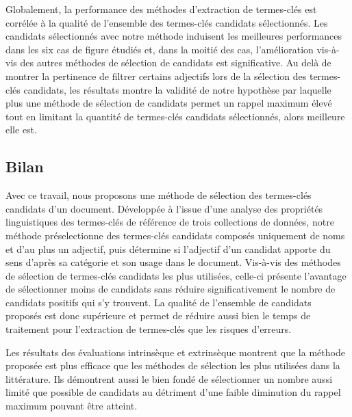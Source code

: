         Globalement, la performance des méthodes d'extraction de termes-clés est
        corrélée à la qualité de l'ensemble des termes-clés candidats
        sélectionnés. Les candidats sélectionnés avec notre méthode induisent
        les meilleures performances dans les six cas de figure étudiés et, dans
        la moitié des cas, l'amélioration vis-à-vis des autres méthodes de
        sélection de candidats est significative. Au delà de montrer la
        pertinence de filtrer certains adjectifs lors de la sélection des
        termes-clés candidats, les résultats montre la validité de notre
        hypothèse par laquelle plus une méthode de sélection de candidats permet
        un rappel maximum élevé tout en limitant la quantité de termes-clés
        candidats sélectionnés, alors meilleure elle est.

    \subsection{Bilan}
    \label{subsec:main-automatic_keyphrase_annotation-keyphrase_candidate_selection-conclusion}
      Avec ce travail, nous proposons une méthode de sélection des termes-clés
      candidats d'un document. Développée à l'issue d'une analyse des
      propriétés linguistiques des termes-clés de référence de trois collections
      de données, notre méthode préselectionne des termes-clés candidats
      composés uniquement de noms et d'au plus un adjectif, puis détermine si
      l'adjectif d'un candidat apporte du sens d'après sa catégorie et son usage
      dans le document. Vis-à-vis des méthodes de sélection de termes-clés
      candidats les plus utilisées, celle-ci présente l'avantage de sélectionner
      moins de candidats sans réduire significativement le nombre de candidats
      positifs qui s'y trouvent. La qualité de l'ensemble de candidats proposés
      est donc supérieure et permet de réduire aussi bien le temps de traitement
      pour l'extraction de termes-clés que les risques d'erreurs.

      Les résultats des évaluations intrinsèque et extrinsèque montrent
      que la méthode proposée est plus efficace que les méthodes de sélection
      les plus utilisées dans la littérature. Ils démontrent aussi le bien fondé
      de sélectionner un nombre aussi limité que possible de candidats au
      détriment d'une faible diminution du rappel maximum pouvant être atteint.


